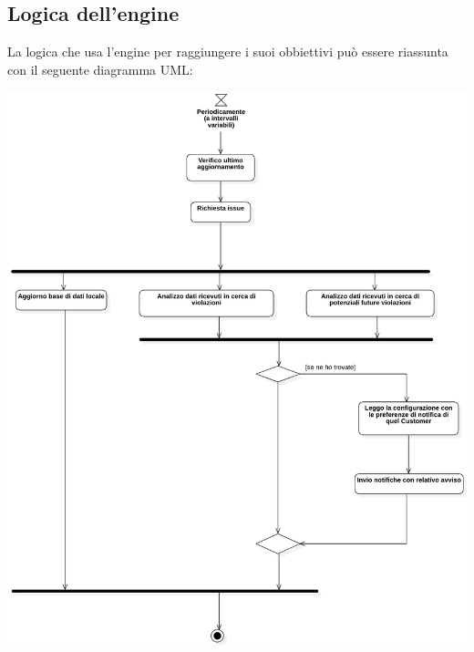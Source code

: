     \subsection{Logica dell'engine}
        La logica che usa l'engine per raggiungere i suoi obbiettivi può essere riassunta con il seguente diagramma UML:
                \begin{center}
            \includegraphics[keepaspectratio = true, width=16.5cm]{immagini/progettazione/activity.png}
        \end{center}
    
        
